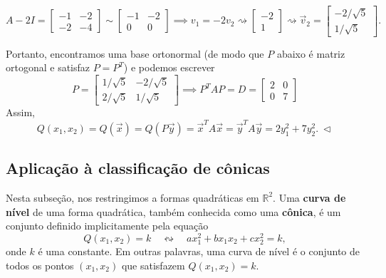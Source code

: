 \documentclass[../livro.tex]{subfiles}
\begin{document}
\begin{example}
\begin{itemize}
		\begin{equation}
		A -2I = 
		\begin{bmatrix}
		-1 & -2 \\
		-2 &  -4
		\end{bmatrix} \sim 
		\begin{bmatrix}
		-1 & -2 \\
		0 &  0
		\end{bmatrix} \implies v_1 = -2v_2 \rightsquigarrow 
		\begin{bmatrix}
		-2 \\ 1
		\end{bmatrix} \rightsquigarrow
		\vec{v}_2 = \begin{bmatrix}
		-2/\sqrt{5} \\ 1/\sqrt{5}
		\end{bmatrix} .
		\end{equation}
	\end{itemize}  Portanto, encontramos uma base ortonormal (de modo que $P$ abaixo é matriz ortogonal e satisfaz $P = P^T$) e podemos escrever
	\begin{equation}
	P = 
	\begin{bmatrix}
	1/\sqrt{5} & -2/\sqrt{5} \\ 
	2/\sqrt{5} & 1/\sqrt{5}
	\end{bmatrix} \implies P^T A P = D = 
	\begin{bmatrix}
	2 & 0 \\ 0 & 7
	\end{bmatrix}
	\end{equation} Assim, 
	\begin{equation}
	Q(x_1, x_2) = Q (\vec{x}) = Q (P\vec{y}) = \vec{x}^T A \vec{x} = \vec{y}^T A \vec{y} =  2 y_1^2 + 7 y_2^2. \ \lhd
	\end{equation}
\end{example}



\subsection{Aplicação à classificação de cônicas}

Nesta subseção, nos restringimos a formas quadráticas em $\mathbb{R}^2$. Uma \textbf{curva de nível} de uma forma quadrática, também conhecida como uma \textbf{cônica}, é um conjunto definido implicitamente pela equação
\begin{equation}
Q(x_1, x_2) = k \quad \leftrightsquigarrow \quad ax_1^2 + bx_1x_2 + cx_2^2 = k,
\end{equation} onde $k$ é uma constante. Em outras palavras, uma curva de nível é o conjunto de todos os pontos $(x_1, x_2)$ que satisfazem $Q(x_1, x_2) = k$.
\end{document}
